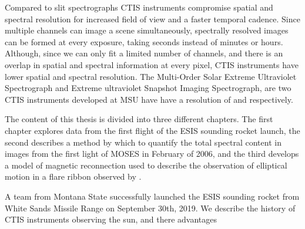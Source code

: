 Compared to slit spectrographs CTIS instruments compromise spatial and spectral resolution for increased field of view and a faster temporal cadence.
Since multiple channels can image a scene simultaneously, spectrally resolved images can be formed at every exposure, taking seconds instead of minutes or hours.
Although, since we can only fit a limited number of channels, and there is an overlap in spatial and spectral information at every pixel, CTIS instruments have lower spatial and spectral resolution.
The Multi-Order Solar Extreme Ultraviolet Spectrograph \citep[MOSES:{}][]{Fox2010} and Extreme ultraviolet Snapshot Imaging Spectrograph\citep[ESIS:][]{}, are two CTIS instruments developed at MSU have have a resolution of  and  respectively. 

The content of this thesis is divided into three different chapters.  
The first chapter explores data from the first flight of the ESIS sounding rocket launch, the second describes a method by which to quantify the total spectral content in images from the first light of MOSES in February of 2006, and the third develops a model of magnetic reconnection used to describe the observation of elliptical motion in a flare ribbon observed by \citet{Brannon2015}.

A team from Montana State successfully launched the ESIS sounding rocket from White Sands Missile Range on September 30th, 2019.
We describe the history of CTIS instruments observing the sun, and there advantages 






	




